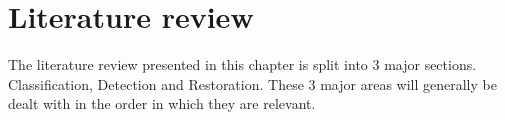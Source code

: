 \chapter{Literature review}\label{ch:LiteratureReview}

\ifpdf
    \graphicspath{{Chapter2_LitReview/Chapter2Figs/PNG/}{Chapter2_LitReview/Chapter2Figs/PDF/}{Chapter2_LitReview/Chapter2Figs/}{Chapter2_LitReview/Chapter2Figs/Classification/}{Chapter2_LitReview/Chapter2Figs/Detection/}{Chapter2_LitReview/Chapter2Figs/Restoration}}
\else
    \graphicspath{{Chapter2_LitReview/Chapter2Figs/EPS/}{Chapter2_LitReview/Chapter2Figs/}}
\fi

The literature review presented in this chapter is split into 3 major sections. Classification, Detection and Restoration. These 3 major areas will generally be dealt with in the order in which they are relevant.

